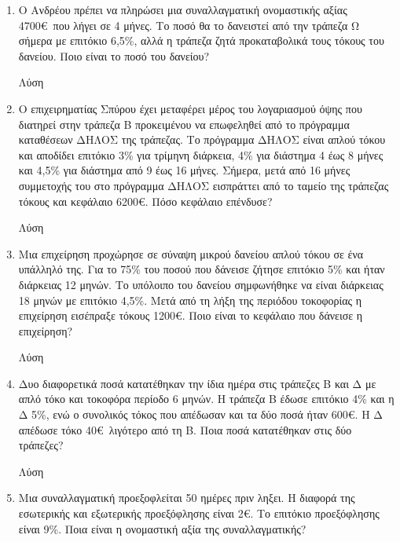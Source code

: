 \documentclass[a4paper,12pt]{article}
\begin{document}
\begin{enumerate}
\item Ο Ανδρέου πρέπει να πληρώσει μια συναλλαγματική ονομαστικής αξίας 4700\euro\ που λήγει σε 4 μήνες. Το ποσό θα το δανειστεί από την τράπεζα Ω σήμερα με επιτόκιο 6,5\%, αλλά η τράπεζα ζητά προκαταβολικά τους τόκους του δανείου. Ποιο είναι το ποσό του δανείου?

\hspace{.15\textwidth}Λύση

\vspace{3cm}

\item Ο επιχειρηματίας Σπύρου έχει μεταφέρει μέρος του λογαριασμού όψης που διατηρεί στην τράπεζα Β προκειμένου να επωφεληθεί από το πρόγραμμα καταθέσεων ΔΗΛΟΣ της τράπεζας. Το πρόγραμμα ΔΗΛΟΣ είναι απλού τόκου και αποδίδει επιτόκιο 3\% για τρίμηνη διάρκεια, 4\% για διάστημα 4 έως 8 μήνες και 4,5\% για διάστημα από 9 έως 16 μήνες. Σήμερα, μετά από 16 μήνες συμμετοχής του στο πρόγραμμα ΔΗΛΟΣ εισπράττει από το ταμείο της τράπεζας τόκους και κεφάλαιο 6200\euro. Πόσο κεφάλαιο επένδυσε?

\hspace{.15\textwidth}Λύση

\vspace{3cm}

\item Μια επιχείρηση προχώρησε σε σύναψη μικρού δανείου απλού τόκου σε ένα υπάλληλό της. Για το 75\% του ποσού που δάνεισε ζήτησε επιτόκιο 5\% και ήταν διάρκειας 12 μηνών. Το υπόλοιπο του δανείου σημφωνήθηκε να είναι διάρκειας 18 μηνών με επιτόκιο 4,5\%. Μετά από τη λήξη της περιόδου τοκοφορίας η επιχείρηση εισέπραξε τόκους 1200\euro. Ποιο είναι το κεφάλαιο που δάνεισε η επιχείρηση?

\hspace{.15\textwidth}Λύση

\vspace{3cm}

\item Δυο διαφορετικά ποσά κατατέθηκαν την ίδια ημέρα στις τράπεζες Β και Δ με απλό τόκο και τοκοφόρα περίοδο 6 μηνών. Η τράπεζα Β έδωσε επιτόκιο 4\% και η Δ 5\%, ενώ ο συνολικός τόκος που απέδωσαν και τα δύο ποσά ήταν 600\euro. Η Δ απέδωσε τόκο 40\euro\ λιγότερο από τη Β. Ποια ποσά κατατέθηκαν στις δύο τράπεζες?

\hspace{.15\textwidth}Λύση

\vspace{3cm}

\item Μια συναλλαγματική προεξοφλείται 50 ημέρες πριν ληξει. Η διαφορά της εσωτερικής και εξωτερικής προεξόφλησης είναι 2\euro. Το επιτόκιο προεξόφλησης είναι 9\%. Ποια είναι η ονομαστική αξία της συναλλαγματικής?


\end{enumerate}
\end{document}
